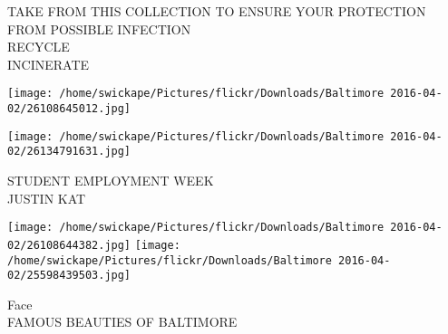 \documentclass[10pt,letterpaper]{article}
\begin{document}
TAKE FROM THIS COLLECTION TO ENSURE YOUR PROTECTION FROM POSSIBLE INFECTION\\
RECYCLE\\
INCINERATE\\
\pagebreak

\texttt{[image: /home/swickape/Pictures/flickr/Downloads/Baltimore 2016-04-02/26108645012.jpg]}

\vspace{0.25in}
\texttt{[image: /home/swickape/Pictures/flickr/Downloads/Baltimore 2016-04-02/26134791631.jpg]}

STUDENT EMPLOYMENT WEEK\\
JUSTIN KAT\\
\pagebreak

\texttt{[image: /home/swickape/Pictures/flickr/Downloads/Baltimore 2016-04-02/26108644382.jpg]}
\texttt{[image: /home/swickape/Pictures/flickr/Downloads/Baltimore 2016-04-02/25598439503.jpg]}

Face\\
FAMOUS BEAUTIES OF BALTIMORE\\
\pagebreak
\end{document}

